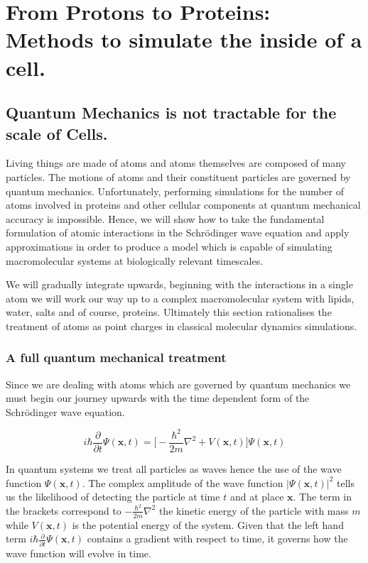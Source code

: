 \chapter{From Protons to Proteins: Methods to simulate the inside of a cell.}
\label{chap:methods}

\section{Quantum Mechanics is not tractable for the scale of Cells.}
Living things are made of atoms and atoms themselves are composed of many particles. The motions of atoms and their constituent particles are governed by quantum mechanics. Unfortunately, performing simulations for the number of atoms involved in proteins and other cellular components at quantum mechanical accuracy is impossible. Hence, we will show how to take the fundamental formulation of atomic interactions in the Schr\"{o}dinger wave equation and apply approximations in order to produce a model which is capable of simulating macromolecular systems at biologically relevant timescales. 

We will gradually integrate upwards, beginning with the interactions in a single atom we will work our way up to a complex macromolecular system with lipids, water, salts and of course, proteins. Ultimately this section rationalises the treatment of atoms as point charges in classical molecular dynamics simulations.

\subsection{A full quantum mechanical treatment}
Since we are dealing with atoms which are governed by quantum mechanics we must begin our journey upwards with the time dependent form of the Schr\"{o}dinger wave equation. 

\begin{equation}
i\hbar \frac {\partial}{\partial t} \Psi (\textbf{x},t) = \big[ -\frac{\hbar ^2}{2m}\nabla^2 + V (\textbf{x}, t) \big] \Psi (\textbf{x},t) 
\label {schordinger_time_dependent}
\end{equation}

In quantum systems we treat all particles as waves hence the use of the wave function $\Psi (\textbf{x},t)$. The complex amplitude of the wave function $|\Psi (\textbf {x}, t)|^2$ tells us the likelihood of detecting the particle at time $t$ and at place $\textbf{x}$. The term in the brackets correspond to $-\frac{\hbar ^2}{2m}\nabla^2 $ the kinetic energy of the particle with mass $m$ while $V (\textbf{x}, t)$ is the potential energy of the system. Given that the left hand term $i\hbar \frac {\partial}{\partial t} \Psi (\textbf{x},t)$ contains a gradient with respect to time, it governs how the wave function will evolve in time.

